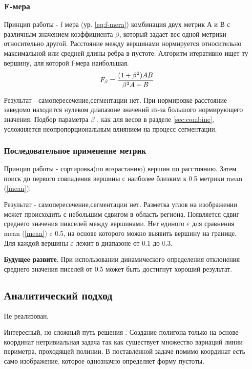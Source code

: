 \documentclass[a4paper, 14pt]{article}
\begin{document}
\subsubsection{F-мера} 
Принцип работы - f мера (ур. \ref{eq:f-mera}) комбинация двух метрик А и В с различным значением коэффициента $\beta$, который задает вес одной метрики относительно другой.   Расстояние между вершинами нормируется относительно максимальной или средней длины ребра в пустоте. 
Алгоритм итеративно ищет ту вершину, для которой f-мера наибольшая. 
\begin{equation}
	F_\beta={{(1+\beta^2)AB} \over {\beta^2 A+B}}
	\label{eq:f-mera}
\end{equation}



Результат - самопересечение,сегментации нет. При нормировке расстояние заведомо находится нулевом диапазоне значений  из-за большого нормирующего значения. Подбор параметра $\beta$ , как  для весов в разделе \ref{sec:combine}, усложняется неопропорциональным влиянием на процесс сегментации. 

\subsubsection{Последовательное применение метрик} 
\label{future}
Принцип работы - сортировка(по возрастанию) вершин по расстоянию. Затем поиск до первого совпадения вершины с наиболее близким к 0.5 метрики mean (\ref{mean}).
 
Результат - самопересечение,сегментации нет. Разметка углов на изображении может происходить с небольшим сдвигом в область региона. Появляется сдвиг среднего значения пикселей между вершинами. Нет единого $\varepsilon$  для сравнения mean (\ref{mean}) c 0.5, на основе которого можно выявить вершину на границе. Для каждой вершины  $\varepsilon$ лежит в диапазоне от 0.1 до 0.3.

\textbf{Будущее развите}. При использовании динамического определения отклонения среднего значения писелей от 0.5 может быть достигнут хороший результат.


\subsection{Аналитический подход}
Не реализован. 

Интересный, но сложный путь решения \cite{polygon_anal}. Создание полигона только на основе координат нетривиальная задача так как существует множество вариаций линии периметра, проходящей полинии. 
В поставленной задаче помимо координат есть само изображение, которое однозначно определяет форму пустоты. 
\end{document}

